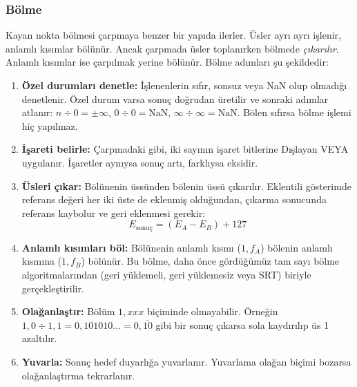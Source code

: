 \subsubsection{Bölme}

Kayan nokta bölmesi çarpmaya benzer bir yapıda ilerler. Üsler ayrı ayrı işlenir, anlamlı kısımlar bölünür. Ancak çarpmada üsler toplanırken bölmede \emph{çıkarılır}. Anlamlı kısımlar ise çarpılmak yerine bölünür. Bölme adımları şu şekildedir:

\begin{enumerate}
\item \textbf{Özel durumları denetle:} İşlenenlerin sıfır, sonsuz veya NaN olup olmadığı denetlenir. Özel durum varsa sonuç doğrudan üretilir ve sonraki adımlar atlanır: $n \div 0 = \pm\infty$, $0 \div 0 = \text{NaN}$, $\infty \div \infty = \text{NaN}$. Bölen sıfırsa bölme işlemi hiç yapılmaz.

\item \textbf{İşareti belirle:} Çarpmadaki gibi, iki sayının işaret bitlerine Dışlayan VEYA uygulanır. İşaretler aynıysa sonuç artı, farklıysa eksidir.

\item \textbf{Üsleri çıkar:} Bölünenin üssünden bölenin üssü çıkarılır. Eklentili gösterimde referans değeri her iki üste de eklenmiş olduğundan, çıkarma sonucunda referans kaybolur ve geri eklenmesi gerekir:
\[
E_\text{sonuç} = (E_A - E_B) + 127
\]

\item \textbf{Anlamlı kısımları böl:} Bölünenin anlamlı kısmı ($1{,}f_A$) bölenin anlamlı kısmına ($1{,}f_B$) bölünür. Bu bölme, daha önce gördüğümüz tam sayı bölme algoritmalarından (geri yüklemeli, geri yüklemesiz veya SRT) biriyle gerçekleştirilir.

\item \textbf{Olağanlaştır:} Bölüm $1{,}xxx$ biçiminde olmayabilir. Örneğin $1{,}0 \div 1{,}1 = 0{,}101010\ldots = 0{,}\overline{10}$ gibi bir sonuç çıkarsa sola kaydırılıp üs 1 azaltılır.

\item \textbf{Yuvarla:} Sonuç hedef duyarlığa yuvarlanır. Yuvarlama olağan biçimi bozarsa olağanlaştırma tekrarlanır.
\end{enumerate}

